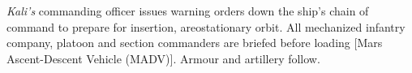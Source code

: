 {\it Kali's} commanding officer issues warning orders down the ship's chain of command to prepare for insertion, areostationary orbit. All mechanized infantry company, platoon and section commanders are briefed before loading [Mars Ascent-Descent Vehicle (MADV)]. Armour and artillery follow.
\StopTimelineDate

